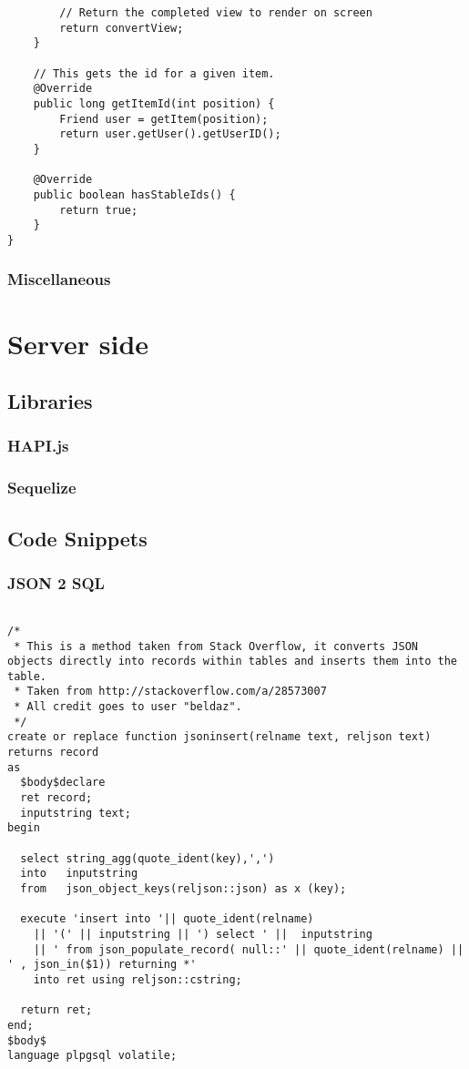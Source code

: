 \begin{lstlisting}
        // Return the completed view to render on screen
        return convertView;
    }

    // This gets the id for a given item.
    @Override
    public long getItemId(int position) {
        Friend user = getItem(position);
        return user.getUser().getUserID();
    }

    @Override
    public boolean hasStableIds() {
        return true;
    }
}
\end{lstlisting}

\subsubsection*{Miscellaneous}



\section{Server side}


\subsection{Libraries}

\subsubsection*{HAPI.js}

\subsubsection*{Sequelize}


\subsection{Code Snippets}

\subsubsection*{JSON 2 SQL}

\lstsql
\begin{lstlisting}

/*
 * This is a method taken from Stack Overflow, it converts JSON objects directly into records within tables and inserts them into the table.
 * Taken from http://stackoverflow.com/a/28573007 
 * All credit goes to user "beldaz".
 */
create or replace function jsoninsert(relname text, reljson text) returns record 
as
  $body$declare
  ret record;
  inputstring text;
begin

  select string_agg(quote_ident(key),',') 
  into   inputstring
  from   json_object_keys(reljson::json) as x (key);

  execute 'insert into '|| quote_ident(relname) 
    || '(' || inputstring || ') select ' ||  inputstring 
    || ' from json_populate_record( null::' || quote_ident(relname) || ' , json_in($1)) returning *'
    into ret using reljson::cstring;

  return ret;
end;
$body$
language plpgsql volatile;

\end{lstlisting}


